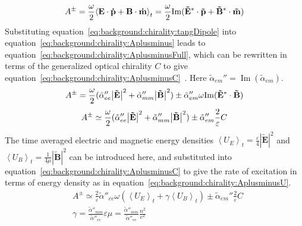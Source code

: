 \begin{equation} \label{eq:background:chirality:Aplusminus}
    {A^ \pm } = 
    \frac{\omega }{2}{\left\langle {{\bf{E}} \cdot {\bf{\dot p}} + {\bf{B}} \cdot {\bf{\dot m}}} \right\rangle _t} = 
    \frac{\omega }{2}{\mathop{\rm Im}\nolimits} ({{\bf{\tilde E}}^ * } \cdot {\bf{\tilde p}} + {{\bf{\tilde B}}^ * } \cdot {\bf{\tilde m}})
\end{equation}
Substituting equation~\ref{eq:background:chirality:tangDipole} into equation~\ref{eq:background:chirality:Aplusminus} leads to equation~\ref{eq:background:chirality:AplusminusFull}, which can be rewritten in terms of the generalized optical chirality $C$ to give equation~\ref{eq:background:chirality:AplusminusC}~\cite{Choi2012}. Here ${\tilde \alpha }_{em}''=\operatorname{Im}({\tilde \alpha }_{em})$.
\begin{equation} \label{eq:background:chirality:AplusminusFull}
    {A^ \pm } = \frac{\omega }{2}({\tilde \alpha ''_{ee}}{\left| {{\bf{\tilde E}}} \right|^2} + {\tilde \alpha ''_{mm}}{\left| {{\bf{\tilde B}}} \right|^2}) \pm {\tilde \alpha }_{em}''\omega {\mathop{\rm Im}\nolimits} ({{\bf{\tilde E}}^ * } \cdot {\bf{\tilde B}})
\end{equation}
\begin{equation} \label{eq:background:chirality:AplusminusC}
    {A^ \pm } \simeq \frac{\omega }{2}({\tilde \alpha ''_{ee}}{\left| {{\bf{\tilde E}}} \right|^2} + {\tilde \alpha ''_{mm}}{\left| {{\bf{\tilde B}}} \right|^2}) \pm {\tilde \alpha }_{em}''\frac{2}{\varepsilon }C
\end{equation}
The time averaged electric and magnetic energy densities ${{\left\langle {{U}_{E}} \right\rangle }_{t}}=\tfrac{\varepsilon }{4}{{\left| {\mathbf{\tilde{E}}} \right|}^{2}}$ and ${{\left\langle {{U}_{B}} \right\rangle }_{t}}=\tfrac{1}{4\mu }{{\left| {\mathbf{\tilde{B}}} \right|}^{2}}$  can be introduced here, and substituted into equation~\ref{eq:background:chirality:AplusminusC} to give the rate of excitation in terms of energy density as in equation~\ref{eq:background:chirality:AplusminusU}. 
\begin{equation}\label{eq:background:chirality:AplusminusU}
    \begin{split}
        & {A^ \pm } \simeq \frac{2}{\varepsilon }{{\tilde \alpha ''}_{ee}}\omega \left( {{{\left\langle {{U_E}} \right\rangle }_t} + \gamma {{\left\langle {{U_B}} \right\rangle }_t}} \right) \pm {\tilde \alpha }_{em}''\frac{2}{\varepsilon }C \\
        & \gamma  = \frac{{{{\tilde \alpha ''}_{mm}}}}{{{{\tilde \alpha ''}_{ee}}}}\varepsilon \mu  = \frac{{{{\tilde \alpha ''}_{mm}}}}{{{{\tilde \alpha ''}_{ee}}}}\frac{{{n^2}}}{{{c^2}}}
    \end{split}
\end{equation}
